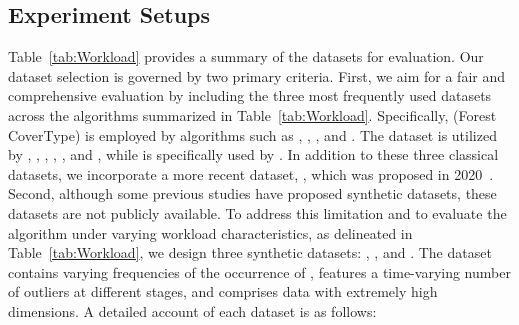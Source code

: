 
\workloadTable
\subsection{Experiment Setups}
\label{subsec:benchmarks}
Table~\ref{tab:Workload} provides a summary of the datasets for evaluation. Our dataset selection is governed by two primary criteria. First, we aim for a fair and comprehensive evaluation by including the three most frequently used datasets across the algorithms summarized in Table~\ref{tab:Workload}. Specifically, \fct (Forest CoverType) is employed by algorithms such as \slkmeans, \skm, \edmstream, and \dbstream. The \kdd dataset is utilized by \skm, \dstream, \edmstream, \denstream, \clustream, and \dbstream, while \sensor is specifically used by \dbstream. In addition to these three classical datasets, we incorporate a more recent dataset, \insect, which was proposed in 2020~\cite{Insect}.
Second, although some previous studies have proposed synthetic datasets, these datasets are not publicly available. To address this limitation and to evaluate the algorithm under varying workload characteristics, as delineated in Table~\ref{tab:Workload}, we design three synthetic datasets: \eds, \ods, and \dimension. The \eds dataset contains varying frequencies of the occurrence of \cef, \ods features a time-varying number of outliers at different stages, and \dimension comprises data with extremely high dimensions.
A detailed account of each dataset is as follows:
